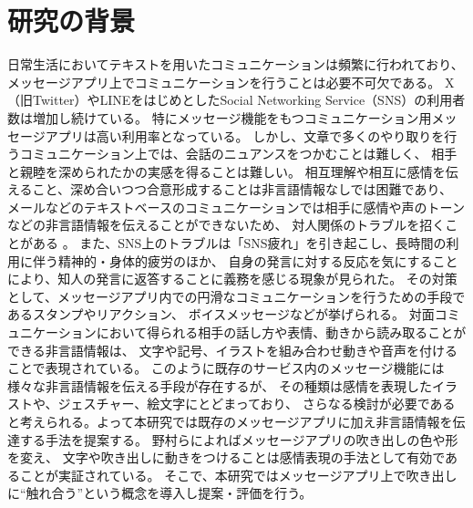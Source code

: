 \documentclass[11pt,a4paper]{ltjsreport}
\begin{document}
   \section{研究の背景}
		日常生活においてテキストを用いたコミュニケーションは頻繁に行われており、
		メッセージアプリ上でコミュニケーションを行うことは必要不可欠である。
		X（旧Twitter）やLINEをはじめとしたSocial Networking Service（SNS）の利用者数は増加し続けている。
		特にメッセージ機能をもつコミュニケーション用メッセージアプリは高い利用率となっている\cite{Web1}。 
		しかし、文章で多くのやり取りを行うコミュニケーション上では、会話のニュアンスをつかむことは難しく、
		相手と親睦を深められたかの実感を得ることは難しい。
		相互理解や相互に感情を伝えること、深め合いつつ合意形成することは非言語情報なしでは困難であり、
		メールなどのテキストベースのコミュニケーションでは相手に感情や声のトーンなどの非言語情報を伝えることができないため、
		対人関係のトラブルを招くことがある \cite{Thesis2}。 
		また、SNS上のトラブルは「SNS疲れ」を引き起こし、長時間の利用に伴う精神的・身体的疲労のほか、
		自身の発言に対する反応を気にすることにより、知人の発言に返答することに義務を感じる現象が見られた\cite{Thesis2}。
		その対策として、メッセージアプリ内での円滑なコミュニケーションを行うための手段であるスタンプやリアクション、
		ボイスメッセージなどが挙げられる。
		対面コミュニケーションにおいて得られる相手の話し方や表情、動きから読み取ることができる非言語情報は、
		文字や記号、イラストを組み合わせ動きや音声を付けることで表現されている。
		このように既存のサービス内のメッセージ機能には様々な非言語情報を伝える手段が存在するが、
		その種類は感情を表現したイラストや、ジェスチャー、絵文字にとどまっており、
		さらなる検討が必要であると考えられる。よって本研究では既存のメッセージアプリに加え非言語情報を伝達する手法を提案する。
		野村らによればメッセージアプリの吹き出しの色や形を変え、
		文字や吹き出しに動きをつけることは感情表現の手法として有効であることが実証されている\cite{Thesis2}。
		そこで、本研究ではメッセージアプリ上で吹き出しに“触れ合う”という概念を導入し提案・評価を行う。
   

\end{document}

